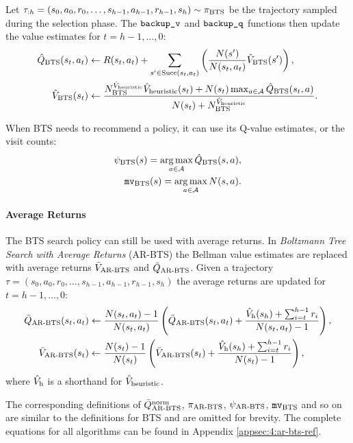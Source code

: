     Let $\tau_{:h}=(s_0,a_0,r_0,\ldots,s_{h-1},a_{h-1},r_{h-1},s_h)\sim{\pi_{{\textnormal{BTS}}}}$ be the trajectory sampled during the selection phase. The ${\textnormal{\texttt{backup\_v}}}$ and ${\textnormal{\texttt{backup\_q}}}$ functions then update the value estimates for $t=h-1,\ldots,0$:
    \begin{align}
        {\hat{Q}_{{\textnormal{BTS}}}}(s_t,a_t) &\leftarrow 
            R(s_t,a_t) + \sum_{s' \in {\textnormal{Succ}(s_t,a_t)}} \left( \frac{N(s')}{N(s_t,a_t)} {\hat{V}_{{\textnormal{BTS}}}}(s') \right), 
                    \label{eq:4:bts_backup_q} \\ 
        {\hat{V}_{{\textnormal{BTS}}}}(s_t) &\leftarrow \frac{N^{{\hat{V}_{\textnormal{heuristic}}}}_{{\textnormal{BTS}}} {\hat{V}_{\textnormal{heuristic}}}(s_t) + N(s_t) \max_{a\in\mathcal{A}} {\hat{Q}_{{\textnormal{BTS}}}}(s_t,a)}{N(s_t)+N^{{\hat{V}_{\textnormal{heuristic}}}}_{{\textnormal{BTS}}}}.
                    \label{eq:4:bts_backup_v} 
    \end{align}
    
    When BTS needs to recommend a policy, it can use its Q-value estimates, or the visit counts:
    \begin{align}
        {\psi_{{\textnormal{BTS}}}}(s)=\operatorname*{arg\,max}_{a\in\mathcal{A}}{\hat{Q}_{{\textnormal{BTS}}}}(s,a), \label{eq:4:psibts} \\
        {\textup{\texttt{mv}}_{{\textnormal{BTS}}}}(s) = \operatorname*{arg\,max}_{a\in\mathcal{A}} N(s,a). \label{eq:4:mvbts}
    \end{align}




    
    \paragraph{Average Returns}

    The BTS search policy can still be used with average returns. In \textit{Boltzmann Tree Search with Average Returns} (AR-BTS) the Bellman value estimates are replaced with average returns ${\bar{V}_{{\textnormal{AR-BTS}}}}$ and ${\bar{Q}_{{\textnormal{AR-BTS}}}}$. Given a trajectory $\tau=(s_0,a_0,r_0,\ldots,s_{h-1},a_{h-1},r_{h-1},s_h)$ the average returns are updated for $t=h-1,\ldots,0$:
    \begin{align}
        {\bar{Q}_{{\textnormal{AR-BTS}}}}(s_t,a_t) &\leftarrow 
            \frac{N(s_t,a_t)-1}{N(s_t,a_t)} \left( {\bar{Q}_{{\textnormal{AR-BTS}}}}(s_t,a_t) 
                + \frac{{\hat{V}_{\textnormal{h}}}(s_h) + \sum_{i=t}^{h-1} r_i}{N(s_t,a_t)-1} \right), \label{eq:4:arbsts_backup_q} \\
        {\bar{V}_{{\textnormal{AR-BTS}}}}(s_t) &\leftarrow 
            \frac{N(s_t)-1}{N(s_t)} \left( {\bar{V}_{{\textnormal{AR-BTS}}}}(s_t) 
                + \frac{{\hat{V}_{\textnormal{h}}}(s_h) + \sum_{i=t}^{h-1} r_i}{N(s_t)-1} \right), \label{eq:4:arbsts_backup_v} 
    \end{align}
    where ${\hat{V}_{\textnormal{h}}}$ is a shorthand for ${\hat{V}_{\textnormal{heuristic}}}$.

    The corresponding definitions of ${\bar{Q}^{{\textnormal{norm}}}_{{\textnormal{AR-BTS}}}}$, ${\pi_{{\textnormal{AR-BTS}}}}$, ${\psi_{{\textnormal{AR-BTS}}}}$, ${\textup{\texttt{mv}}_{{\textnormal{BTS}}}}$ and so on are similar to the definitions for BTS and are omitted for brevity. The complete equations for all algorithms can be found in Appendix \ref{appsec:4:ar-bts-ref}.





